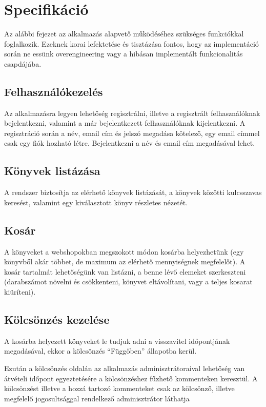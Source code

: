 \chapter{Specifikáció}

Az alábbi fejezet az alkalmazás alapvető működéséhez szükséges funkciókkal foglalkozik. Ezeknek korai lefektetése
és tisztázása fontos, hogy az implementáció során ne essünk overengineering\cite{Overengineering} vagy a hibásan implementált funkcionalitás csapdájába.

\section{Felhasználókezelés}

Az alkalmazásra legyen lehetőség regisztrálni, illetve a regisztrált felhasználóknak bejelentkezni, valamint a már bejelentkezett felhasználóknak kijelentkezni.
A regisztráció során a név, email cím és jelszó megadása kötelező, egy email címmel csak egy fiók hozható létre.
Bejelentkezni a név és email cím megadásával lehet.

\section{Könyvek listázása}

A rendszer biztosítja az elérhető könyvek listázását, a könyvek közötti kulcsszavas keresést, valamint
egy kiválasztott könyv részletes nézetét.

\section{Kosár}

A könyveket a webshopokban megszokott módon kosárba helyezhetünk (egy könyvből akár többet, de maximum az elérhető mennyiségnek megfelelőt).
A kosár tartalmát lehetőségünk van listázni, a benne lévő elemeket szerkeszteni (darabszámot növelni és csökkenteni, könyvet eltávolítani, vagy a teljes kosarat kiüríteni).

\section{Kölcsönzés kezelése}

A kosárba helyezett könyveket le tudjuk adni a visszavitel időpontjának megadásával, ekkor a kölcsönzés ``Függőben'' állapotba kerül.

Ezután a kölcsönzés oldalán az alkalmazás adminisztrátoraival lehetőség van átvételi időpont egyeztetésére a kölcsönzéshez fűzhető kommenteken keresztül.
A kölcsönzést illetve a hozzá tartozó kommenteket csak az kölcsönző, illetve megfelelő jogosultsággal rendelkező adminisztrátor láthatja

